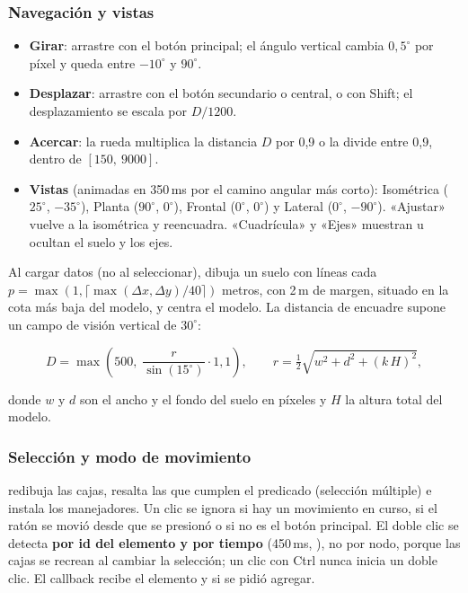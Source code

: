\subsubsection{Navegación y vistas}

\begin{itemize}
	\item \textbf{Girar}: arrastre con el botón principal; el ángulo vertical cambia $0{,}5^\circ$ por píxel y queda
	      entre $-10^\circ$ y $90^\circ$.
	\item \textbf{Desplazar}: arrastre con el botón secundario o central, o con Shift; el desplazamiento se escala por
	      $D/1200$.
	\item \textbf{Acercar}: la rueda multiplica la distancia $D$ por 0,9 o la divide entre 0,9, dentro de
	      $[150,\ 9000]$.
	\item \textbf{Vistas} (animadas en 350\,ms por el camino angular más corto): Isométrica ($25^\circ$, $-35^\circ$),
	      Planta ($90^\circ$, $0^\circ$), Frontal ($0^\circ$, $0^\circ$) y Lateral ($0^\circ$, $-90^\circ$).
	      «Ajustar» vuelve a la isométrica y reencuadra. «Cuadrícula» y «Ejes» muestran u ocultan el suelo y los ejes.
\end{itemize}

Al cargar datos (no al seleccionar),  dibuja un suelo con líneas cada
$p = \max\!\left(1, \lceil \max(\Delta x, \Delta y) / 40 \rceil\right)$ metros, con 2\,m de margen, situado en la cota
más baja del modelo, y centra el modelo. La distancia de encuadre supone un campo de visión vertical de $30^\circ$:

\begin{equation}
	D = \max\!\left(500,\; \frac{r}{\sin(15^\circ)} \cdot 1{,}1\right), \qquad
	r = \tfrac{1}{2} \sqrt{w^2 + d^2 + \left(k \, H\right)^2},
\end{equation}

\noindent donde $w$ y $d$ son el ancho y el fondo del suelo en píxeles y $H$ la altura total del modelo.

\subsubsection{Selección y modo de movimiento}

 redibuja las cajas, resalta las que
cumplen el predicado (selección múltiple) e instala los manejadores. Un clic se ignora si hay un movimiento en curso,
si el ratón se movió desde que se presionó o si no es el botón principal. El doble clic se detecta \textbf{por id del
elemento y por tiempo} (450\,ms, ), no por nodo, porque las cajas se recrean al
cambiar la selección; un clic con Ctrl nunca inicia un doble clic. El callback  recibe el elemento y si se
pidió agregar.

